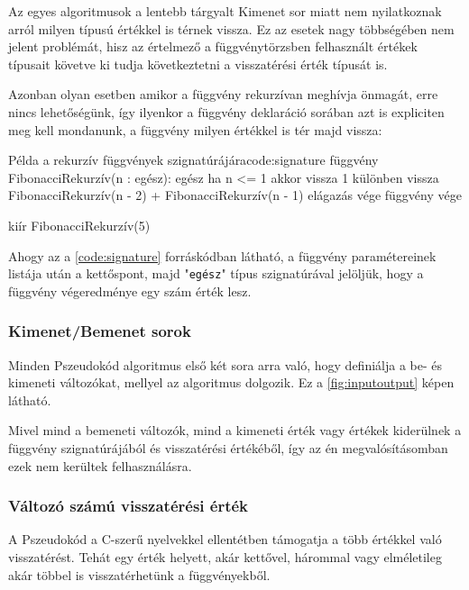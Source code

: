 Az egyes algoritmusok a lentebb tárgyalt Kimenet sor miatt nem nyilatkoznak arról milyen típusú értékkel is térnek vissza. Ez az esetek nagy többségében nem jelent problémát, hisz az értelmező a függvénytörzsben felhasznált értékek típusait követve ki tudja következtetni a visszatérési érték típusát is.

Azonban olyan esetben amikor a függvény rekurzívan meghívja önmagát, erre nincs lehetőségünk, így ilyenkor a függvény deklaráció sorában azt is expliciten meg kell mondanunk, a függvény milyen értékkel is tér majd vissza:

\begin{code}{Példa a rekurzív függvények szignatúrájára}{code:signature}
függvény FibonacciRekurzív(n : egész): egész
  ha n <= 1 akkor
    vissza 1
  különben
    vissza FibonacciRekurzív(n - 2) + FibonacciRekurzív(n - 1)
  elágazás vége
függvény vége

kiír FibonacciRekurzív(5)
\end{code}

Ahogy az a \ref{code:signature} forráskódban látható, a függvény paramétereinek listája után a kettőspont, majd "\texttt{egész}" típus szignatúrával jelöljük, hogy a függvény végeredménye egy szám érték lesz.

\subsubsection{Kimenet/Bemenet sorok}

Minden Pszeudokód algoritmus első két sora arra való, hogy definiálja a be- és kimeneti változókat, mellyel az algoritmus dolgozik. Ez a \ref{fig:inputoutput} képen látható.


Mivel mind a bemeneti változók, mind a kimeneti érték vagy értékek kiderülnek a függvény szignatúrájából és visszatérési értékéből, így az én megvalósításomban ezek nem kerültek felhasználásra.

\subsubsection{Változó számú visszatérési érték}

A Pszeudokód a C-szerű nyelvekkel ellentétben támogatja a több értékkel való visszatérést. Tehát egy érték helyett, akár kettővel, hárommal vagy elméletileg akár többel is visszatérhetünk a függvényekből.

